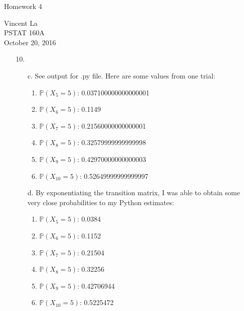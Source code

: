 \documentclass[11pt]{article}
\title{ }
\begin{document}
	\begin{center}	%
		\Large{Homework 4}	%
	\end{center}
	\begin{center}
		Vincent La \\
		PSTAT 160A \\
		October 20, 2016
	\end{center}

\begin{enumerate}

\item[10.]
	\begin{enumerate}
		\item[c.] See output for .py file. Here are some values from one trial:
		\begin{enumerate}
			\item $\mathbb{P}(X_5 = 5)$: 0.037100000000000001
			\item $\mathbb{P}(X_6 = 5)$:  0.1149
			\item $\mathbb{P}(X_7 = 5)$:  0.21560000000000001
			\item $\mathbb{P}(X_8 = 5)$:  0.32579999999999998
			\item $\mathbb{P}(X_9 = 5)$:  0.42970000000000003
			\item $\mathbb{P}(X_10 = 5)$:  0.52649999999999997
			\end{enumerate}
		\item[d.] By exponentiating the transition matrix, I was able to obtain some very close probabilities to my Python estimates:
			\begin{enumerate}
				\item $\mathbb{P}(X_5 = 5)$: 0.0384
				\item $\mathbb{P}(X_6 = 5)$: 0.1152
				\item $\mathbb{P}(X_7 = 5)$: 0.21504
				\item $\mathbb{P}(X_8 = 5)$: 0.32256
				\item $\mathbb{P}(X_9 = 5)$: 0.42706944
				\item $\mathbb{P}(X_10 = 5)$: 0.5225472
			\end{enumerate}
	\end{enumerate}
\end{enumerate}
\end{document}
